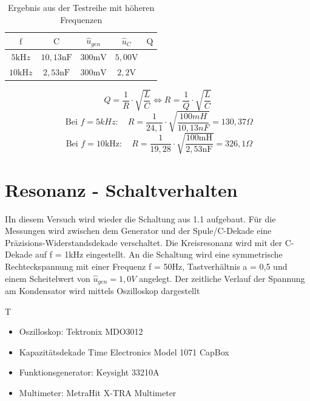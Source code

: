 \documentclass{article}
\begin{document}
\begin{table}[h]

  \begin{center}

    \begin{tabular}{|c|c|c|c|c|}
      \hline $\mathrm{f}$       & $\mathrm{C}$        & $\hat{u}_{g e n}$ & $\hat{u}_C$       & $\mathrm{Q}$ \\
      \hline $5 \mathrm{kH} z$  & $10,13 \mathrm{nF}$ & $300 \mathrm{mV}$ & $5,00 \mathrm{V}$ &              \\
      \hline $10 \mathrm{kH} z$ & $2,53 \mathrm{nF}$  & $300 \mathrm{mV}$ & $2,2 \mathrm{V}$  &              \\
      \hline
    \end{tabular}
    \caption{Ergebnis aus der Testreihe mit höheren Frequenzen}
    \label{tab:lCUQ}
  \end{center}
\end{table}
$$Q=\frac{1}{R} \cdot \sqrt{\frac{L}{C}} \Leftrightarrow R=\frac{1}{Q} \cdot \sqrt{\frac{L}{C}}$$
\begin{equation*}
  \text { Bei } f=5 k H z: \quad R=\frac{1}{24,1} \cdot \sqrt{\frac{100 m H}{10,13 n F}}=130,37 \Omega
\end{equation*}
\begin{equation*}
  \text { Bei } f=10 \mathrm{kHz}: \quad R=\frac{1}{19,28} \cdot \sqrt{\frac{100 \mathrm{mH}}{2,53 \mathrm{nF}}}=326,1 \Omega
\end{equation*}

\newpage
\section{Resonanz - Schaltverhalten}
\begin{task}
  IIn diesem Versuch wird wieder die Schaltung aus 1.1 aufgebaut. Für die Messungen wird zwischen dem Generator und der Spule/C-Dekade eine Präzisions-Widerstandsdekade verschaltet.
  Die Kreisresonanz wird mit der C-Dekade auf f = 1kHz eingestellt. An die Schaltung wird eine symmetrische Rechteckspannung mit einer Frequenz f = 50Hz, Tastverhältnis a = 0,5 und einem Scheitelwert von $\hat{u}_{gen} = 1,0 V$ angelegt.
  Der zeitliche Verlauf der Spannung am Kondensator wird mittels Oszilloskop dargestellt
\end{task}

\begin{devlist}
  T
  \begin{itemize}
    \item Oszilloskop: Tektronix MDO3012
    \item Kapazitätsdekade Time Electronics Model 1071 CapBox
    \item Funktionsgenerator: Keysight 33210A
    \item Multimeter: MetraHit X-TRA Multimeter
  \end{itemize}
\end{devlist}
\end{document}
